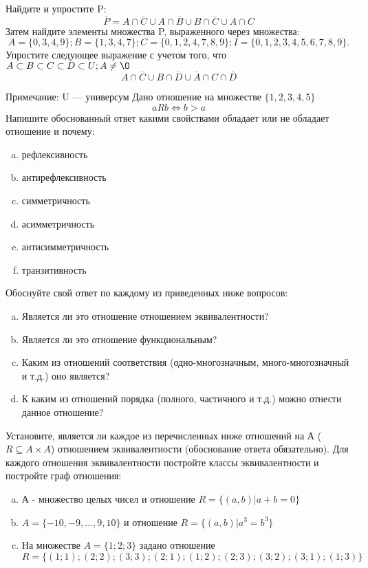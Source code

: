 \documentclass[10pt]{exam}
\begin{document}
\begin{questions}
\question
Найдите и упростите P:
\begin{equation*}
\overline{P} = A \cap \overline{C} \cup A \cap \overline{B} \cup B \cap \overline{C} \cup A \cap C
\end{equation*}
Затем найдите элементы множества P, выраженного через множества:
\begin{equation*}
A = \{0, 3, 4, 9\}; 
B = \{1, 3, 4, 7\};
C = \{0, 1, 2, 4, 7, 8, 9\};
I = \{0, 1, 2, 3, 4, 5, 6, 7, 8, 9\}.
\end{equation*}\question
Упростите следующее выражение с учетом того, что $A\subset B \subset C \subset D \subset U; A \neq \O$
\begin{equation*}
A \cap  \overline{C} \cup B \cap \overline{D} \cup  \overline{A} \cap C \cap  \overline{D}
\end{equation*}

Примечание: U — универсум\question
Дано отношение на множестве $\{1, 2, 3, 4, 5\}$ 
\begin{equation*}
aRb \iff b > a
\end{equation*}
Напишите обоснованный ответ какими свойствами обладает или не обладает отношение и почему:   
\begin{enumerate} [a)]\setcounter{enumi}{0}
\item рефлексивность
\item антирефлексивность
\item симметричность
\item асимметричность
\item антисимметричность
\item транзитивность
\end{enumerate}

Обоснуйте свой ответ по каждому из приведенных ниже вопросов:
\begin{enumerate} [a)]\setcounter{enumi}{0}
    \item Является ли это отношение отношением эквивалентности?
    \item Является ли это отношение функциональным?
    \item Каким из отношений соответствия (одно-многозначным, много-многозначный и т.д.) оно является?
    \item К каким из отношений порядка (полного, частичного и т.д.) можно отнести данное отношение?
\end{enumerate}

\question
Установите, является ли каждое из перечисленных ниже отношений на А ($R \subseteq A \times A$) отношением эквивалентности (обоснование ответа обязательно). Для каждого отношения эквивалентности 
постройте классы эквивалентности и постройте граф отношения:
\begin{enumerate}[a)]\setcounter{enumi}{0}
\item А - множество целых чисел и отношение $R = \{(a,b)|a + b = 0\}$
\item $A = \{-10, -9, …, 9, 10\}$ и отношение $R = \{(a,b)|a^{3} = b^{3}\}$
\item На множестве $A = \{1; 2; 3\}$ задано отношение $R = \{(1; 1); (2; 2); (3; 3); (2; 1); (1; 2); (2; 3); (3; 2); (3; 1); (1; 3)\}$


\end{enumerate}
\end{questions}
\end{document}
